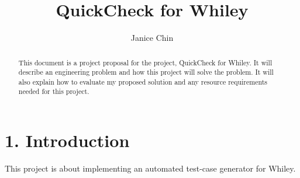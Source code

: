 \documentclass[11pt, a4paper, twoside, openright]{report}
\title{QuickCheck for Whiley}
\author{Janice Chin}
\date{}
\begin{document}
\frontmatter


\begin{abstract}
   This document is a project proposal for the project, QuickCheck for Whiley. It will describe an engineering problem and how this project will solve the problem. It will also explain how to evaluate my proposed solution and any resource requirements needed for this project.
\end{abstract}


\maketitle






\section*{1. Introduction}


This project is about implementing an automated test-case generator for Whiley.

%
\end{document}

